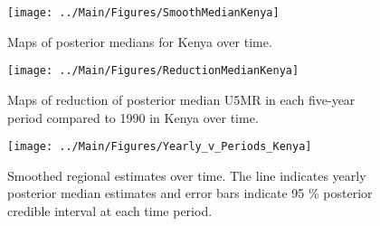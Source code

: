 \documentclass[12pt]{article}\usepackage[]{graphicx}\usepackage[]{color}
\newenvironment{knitrout}{}{} %
\begin{document}
\begin{knitrout}
\color{fgcolor}\begin{figure}[bht]

{\centering \texttt{[image: ../Main/Figures/SmoothMedianKenya]} 

}

\caption[Maps of posterior medians for Kenya  over time]{Maps of posterior medians for Kenya  over time.}\label{fig:unnamed-chunk-164}
\end{figure}


\end{knitrout}
\begin{knitrout}
\color{fgcolor}\begin{figure}[bht]

{\centering \texttt{[image: ../Main/Figures/ReductionMedianKenya]} 

}

\caption[Maps of reduction of posterior median U5MR in each five-year period compared to 1990 in Kenya over time]{Maps of reduction of posterior median U5MR in each five-year period compared to 1990 in Kenya over time.}\label{fig:unnamed-chunk-165}
\end{figure}


\end{knitrout}
\begin{knitrout}
\color{fgcolor}\begin{figure}[bht]

{\centering \texttt{[image: ../Main/Figures/Yearly\_v\_Periods\_Kenya]} 

}

\caption[Smoothed regional estimates over time]{Smoothed regional estimates over time. The line indicates yearly posterior median estimates and error bars indicate 95 \% posterior credible interval at each time period.}\label{fig:unnamed-chunk-166}
\end{figure}


\end{knitrout}
\end{document}
